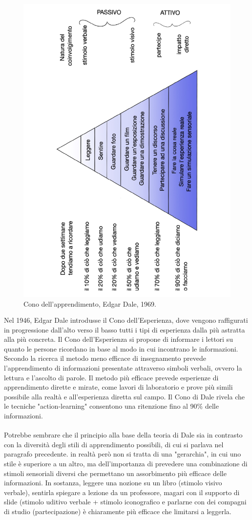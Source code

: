 \begin{figure}[h!]
  \centerline{\includegraphics[height = 12 cm, width= 8 cm, angle=270]{figures/cono.pdf}}
  \caption{Cono dell'apprendimento, Edgar Dale, 1969.}
\end{figure}
Nel 1946, Edgar Dale introdusse il Cono dell'Esperienza, dove vengono raffigurati in progressione dall'alto verso il basso tutti i tipi di esperienza dalla più astratta alla più concreta. Il Cono dell'Esperienza si propone di informare i lettori su quanto le persone ricordano in base al modo in cui incontrano le informazioni. Secondo la ricerca il metodo meno efficace di insegnamento prevede l'apprendimento di informazioni presentate attraverso simboli verbali, ovvero la lettura e l'ascolto di parole. Il metodo più efficace prevede esperienze di apprendimento dirette e mirate, come lavori di laboratorio e prove più simili possibile alla realtà e all'esperienza diretta sul campo. Il Cono di Dale rivela che le tecniche "action-learning" consentono una ritenzione fino al 90\% delle informazioni.\\
\\
Potrebbe sembrare che il principio alla base della teoria di Dale sia in contrasto con la diversità degli stili di apprendimento possibili, di cui si parlava nel paragrafo precedente. in realtà però non si tratta di una "gerarchia", in cui uno stile è superiore a un altro, ma dell'importanza di prevedere una combinazione di stimoli sensoriali diversi che permettano un assorbimento più efficace delle informazioni. In sostanza, leggere una nozione su un libro (stimolo visivo verbale), sentirla spiegare a lezione da un professore, magari con il supporto di slide (stimolo uditivo verbale + stimolo iconografico e parlarne con dei compagni di studio (partecipazione) è chiaramente più efficace che limitarsi a leggerla.
